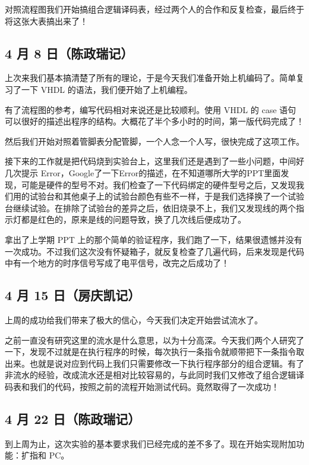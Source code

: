 \documentclass[12pt]{article}
\begin{document}
{        对照流程图我们开始搞组合逻辑译码表，经过两个人的合作和反复检查，最后终于将这张大表搞出来了！
    
    \subsection{4 月 8 日（陈政瑞记）}
        上次来我们基本搞清楚了所有的理论，于是今天我们准备开始上机编码了。简单复习了一下 VHDL 的语法，我们便开始了上机编程。
        
        有了流程图的参考，编写代码相对来说还是比较顺利。使用 VHDL 的 case 语句可以很好的描述出程序的结构。大概花了半个多小时的时间，第一版代码完成了！
        
        然后我们开始对照着管脚表分配管脚，一个人念一个人写，很快完成了这项工作。
        
        接下来的工作就是把代码烧到实验台上，这里我们还是遇到了一些小问题，中间好几次提示 Error，Google了一下Error的描述，在不知道哪所大学的PPT里面发现，可能是硬件的型号不对。我们检查了一下代码绑定的硬件型号之后，又发现我们用的试验台和其他桌子上的试验台颜色有些不一样，于是我们选择换了一个试验台继续试验。在排除了试验台的差异之后，依旧烧录不上，我们又发现线的两个指示灯都是红色的，原来是线的问题导致，换了几次线后便成功了。
        
        拿出了上学期 PPT 上的那个简单的验证程序，我们跑了一下，结果很遗憾并没有一次成功。不过我们这次没有怀疑箱子，就反复检查了几遍代码，后来发现是代码中有一个地方的时序信号写成了电平信号，改完之后成功了！
        
    \subsection{4 月 15 日（房庆凯记）}
        上周的成功给我们带来了极大的信心，今天我们决定开始尝试流水了。
        
        之前一直没有研究这里的流水是什么意思，以为十分高深。今天我们两个人研究了一下，发现不过就是在执行程序的时候，每次执行一条指令就顺带把下一条指令取出来。也就是说对应到代码上我们只需要修改一下执行程序部分的组合逻辑。有了非流水的经验，改成流水还是相对比较容易的，与此同时我们又修改了组合逻辑译码表和我们的代码，按照之前的流程开始测试代码。竟然取得了一次成功！
    \subsection{4 月 22 日（陈政瑞记）}
        到上周为止，这次实验的基本要求我们已经完成的差不多了。现在开始实现附加功能：扩指和 PC。
        
}
\end{document}
